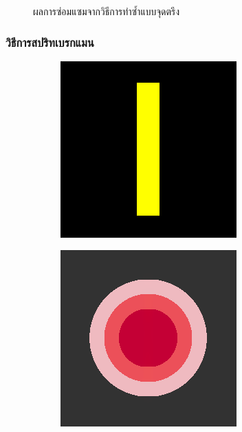 \documentclass[xcolor=dvipsnames, xetex,serif]{beamer}
\numberwithin{equation}{section}
\begin{document}
\begin{frame}
\begin{figure}[H]
\begin{subfigure}{0.3\linewidth}
				\end{subfigure}
				\caption{ผลการซ่อมแซมจากวิธีการทำซ้ำแบบจุดตรึง}
			\end{figure}
		\end{frame}
		\begin{frame}
			\frametitle{วิธีการสปริทเบรกแมน}
			\begin{figure}[H]
				\centering
				\begin{subfigure}{0.3\linewidth}
					\centering
					\includegraphics[width=0.7\linewidth]{images/result_ex1/splitbergman01.png}
				\end{subfigure}
				\begin{subfigure}{0.3\linewidth}
					\centering
					\includegraphics[width=0.7\linewidth]{images/result_ex1/splitbergman02.png}
				\end{subfigure}

\end{figure}
\end{frame}
\end{document}
